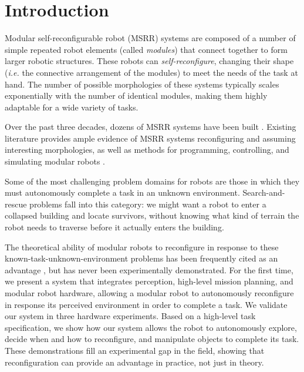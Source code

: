 \documentclass[journal]{IEEEtran}
\begin{document}
\IEEEpeerreviewmaketitle


\section{Introduction} \label{sec:introduction}
%
Modular self-reconfigurable robot (MSRR) systems are composed of a number of simple repeated robot elements (called \emph{modules}) that connect together to form larger robotic structures. These robots can \emph{self-reconfigure}, changing their shape (\emph{i.e.} the connective arrangement of the modules) to meet the needs of the task at hand.
The number of possible morphologies of these systems typically scales exponentially with the number of identical modules, making them highly adaptable for a wide variety of tasks.

Over the past three decades, dozens of MSRR systems have been built \cite{Yim2007a}. Existing literature provides ample evidence of MSRR systems reconfiguring and assuming interesting morphologies, as well as methods for programming, controlling, and simulating modular robots \cite{Yim2007,Jing2016,Yim1994}.

Some of the most challenging problem domains for robots are those in which they must autonomously complete a task in an unknown environment.  Search-and-rescue problems fall into this category: we might want a robot to enter a collapsed building and locate survivors, without knowing what kind of terrain the robot needs to traverse before it actually enters the building.

The theoretical ability of modular robots to reconfigure in response to these known-task-unknown-environment problems has been frequently cited as an advantage \cite{Yim2007a}, but has never been experimentally demonstrated.
For the first time, we present a system that integrates perception, high-level mission planning, and modular robot hardware, allowing a modular robot to autonomously reconfigure in response its perceived environment in order to complete a task.
We validate our system in three hardware experiments.  Based on a high-level task specification, we show how our system allows the robot to autonomously explore, decide when and how to reconfigure, and manipulate objects to complete its task.
These demonstrations fill an experimental gap in the field, showing that reconfiguration can provide an advantage in practice, not just in theory.
\end{document}
